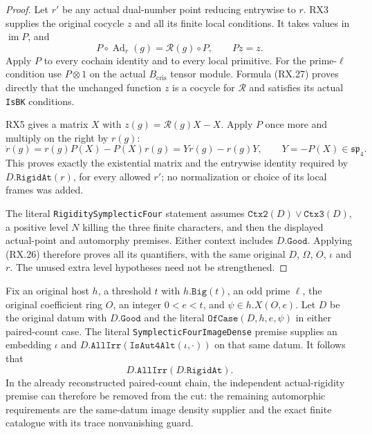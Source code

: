 \begin{proof}
Let $r'$ be any actual dual-number point reducing entrywise to $r$.
RX3 supplies the original cocycle $z$ and all its finite local
conditions.  It takes values in $\operatorname{im}P$, and
\[
 P\circ\operatorname{Ad}_r(g)
             =\mathcal R(g)\circ P,\qquad Pz=z.
 \tag{RX.27}
\]
Apply $P$ to every cochain identity and to every local primitive.
For the prime-$\ell$ condition use $P\otimes1$ on the actual
$B_{\mathrm{cris}}$ tensor module.  Formula (RX.27) proves directly
that the unchanged function $z$ is a cocycle for $\mathcal R$ and
satisfies its actual \texttt{IsBK} conditions.

RX5 gives a matrix $X$ with $z(g)=\mathcal R(g)X-X$.
Apply $P$ once more and multiply on the right by $r(g)$:
\[
    \dot r(g)=r(g)P(X)-P(X)r(g)
                   =Y r(g)-r(g)Y,\qquad Y=-P(X)\in\mathfrak{sp}_4.
 \tag{RX.28}
\]
This proves exactly the existential matrix and the entrywise
identity required by $D.\texttt{RigidAt}(r)$, for every allowed
$r'$; no normalization or choice of its local frames was added.

The literal \texttt{RigiditySymplecticFour} statement assumes
$\texttt{Ctx2}(D)\lor\texttt{Ctx3}(D)$, a positive level $N$
killing the three finite characters, and then the displayed
actual-point and automorphy premises.  Either context includes
$D.\texttt{Good}$.  Applying (RX.26) therefore proves all its
quantifiers, with the same original $D$, $\Omega$, $O$, $\iota$
and $r$.  The unused extra level hypotheses need not be strengthened.
\end{proof}

\begin{corollary}
\label{cor:rx-same-datum}
Fix an original host $h$, a threshold $t$ with $h.\texttt{Big}(t)$,
an odd prime $\ell$, the original coefficient ring $O$, an integer
$0<e<t$, and $\psi\in h.X(O,e)$.  Let $D$ be the original datum
with $D.\texttt{Good}$ and the literal
$\texttt{OfCase}(D,h,e,\psi)$ in either paired-count case.
The literal \texttt{SymplecticFourImageDense} premise supplies an
embedding $\iota$ and
$D.\texttt{AllIrr}(\texttt{IsAut4Alt}(\iota,\cdot))$ on that
same datum.  It follows that
\[
                          D.\texttt{AllIrr}(D.\texttt{RigidAt}).
 \tag{RX.29}
\]
In the already reconstructed paired-count chain, the independent
actual-rigidity premise can therefore be removed from the cut:
the remaining automorphic requirements are the same-datum image
density supplier and the exact finite catalogue with its trace
nonvanishing guard.
\end{corollary}

